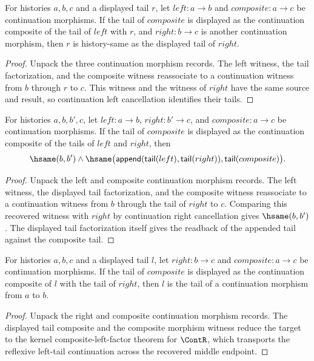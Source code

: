 \begin{theorem}
\label{thm:continuation-morphism-comp-right-factor-tail-hsame}
For histories $a,b,c$ and a displayed tail $r$, let $left:a\to b$ and
$composite:a\to c$ be continuation morphisms. If the tail of $composite$ is
displayed as the continuation composite of the tail of $left$ with $r$, and
$right:b\to c$ is another continuation morphism, then $r$ is history-same as
the displayed tail of $right$.
\end{theorem}
\begin{proof}
Unpack the three continuation morphism records. The left witness, the tail
factorization, and the composite witness reassociate to a continuation witness
from $b$ through $r$ to $c$. This witness and the witness of $right$ have the
same source and result, so continuation left cancellation identifies their
tails.
\end{proof}

\begin{theorem}
\label{thm:continuation-morphism-comp-middle-tail-readback}
For histories $a,b,b',c$, let $left:a\to b$, $right:b'\to c$, and
$composite:a\to c$ be continuation morphisms. If the tail of $composite$ is
displayed as the continuation composite of the tails of $left$ and $right$,
then
$$
\hsame(b,b')\land
\hsame\bigl(\mathsf{append}(\mathsf{tail}(left),\mathsf{tail}(right)),
\mathsf{tail}(composite)\bigr).
$$
\end{theorem}
\begin{proof}
Unpack the left and composite continuation morphism records. The left witness,
the displayed tail factorization, and the composite witness reassociate to a
continuation witness from $b$ through the tail of $right$ to $c$. Comparing
this recovered witness with $right$ by continuation right cancellation gives
$\hsame(b,b')$. The displayed tail factorization itself gives the readback of
the appended tail against the composite tail.
\end{proof}

\begin{definition}
\label{def:continuation-morphism-composite-left-factor}
For histories $a,b,c$ and a displayed tail $l$, let $right:b\to c$ and
$composite:a\to c$ be continuation morphisms. If the tail of $composite$ is
displayed as the continuation composite of $l$ with the tail of $right$, then
$l$ is the tail of a continuation morphism from $a$ to $b$.
\end{definition}
\begin{proof}
Unpack the right and composite continuation morphism records. The displayed
tail composite and the composite morphism witness reduce the target to the
kernel composite-left-factor theorem for $\ContR$, which transports the
reflexive left-tail continuation across the recovered middle endpoint.
\end{proof}


